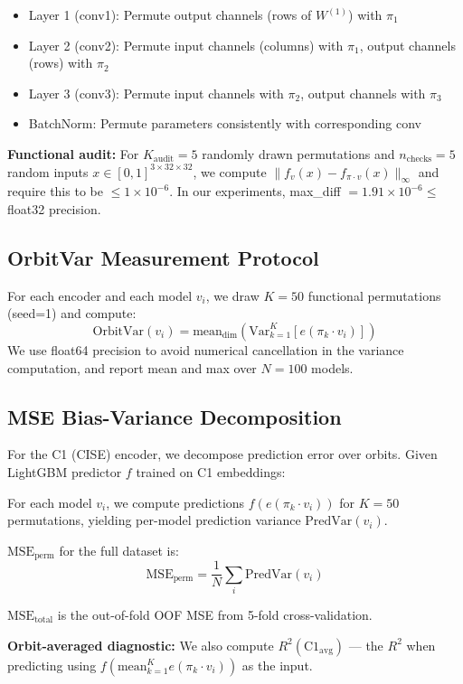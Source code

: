\begin{itemize}
\item Layer 1 (conv1): Permute output channels (rows of $W^{(1)}$) with $\pi_1$
\item Layer 2 (conv2): Permute input channels (columns) with $\pi_1$, output channels (rows) with $\pi_2$
\item Layer 3 (conv3): Permute input channels with $\pi_2$, output channels with $\pi_3$
\item BatchNorm: Permute parameters consistently with corresponding conv
\end{itemize}

\textbf{Functional audit:} For $K_\text{audit}=5$ randomly drawn permutations and $n_\text{checks}=5$ random inputs $x \in [0,1]^{3 \times 32 \times 32}$, we compute $\|f_v(x) - f_{\pi \cdot v}(x)\|_\infty$ and require this to be $\le 1 \times 10^{-6}$. In our experiments, max\_diff $= 1.91 \times 10^{-6} \le$ float32 precision.

\subsection{OrbitVar Measurement Protocol}

For each encoder and each model $v_i$, we draw $K=50$ functional permutations (seed=1) and compute:
\[
\text{OrbitVar}(v_i) = \text{mean}_\text{dim}\!\left(\text{Var}_{k=1}^K \left[ e(\pi_k \cdot v_i) \right]\right)
\]
We use float64 precision to avoid numerical cancellation in the variance computation, and report mean and max over $N=100$ models.

\subsection{MSE Bias-Variance Decomposition}

For the C1 (CISE) encoder, we decompose prediction error over orbits. Given LightGBM predictor $f$ trained on C1 embeddings:

For each model $v_i$, we compute predictions $f(e(\pi_k \cdot v_i))$ for $K=50$ permutations, yielding per-model prediction variance $\text{PredVar}(v_i)$.

$\text{MSE}_\text{perm}$ for the full dataset is:
\[
\text{MSE}_\text{perm} = \frac{1}{N} \sum_i \text{PredVar}(v_i)
\]

$\text{MSE}_\text{total}$ is the out-of-fold OOF MSE from 5-fold cross-validation.

\textbf{Orbit-averaged diagnostic:} We also compute $R^2(\text{C1}_\text{avg})$ --- the $R^2$ when predicting using $f(\text{mean}_{k=1}^K e(\pi_k \cdot v_i))$ as the input.

